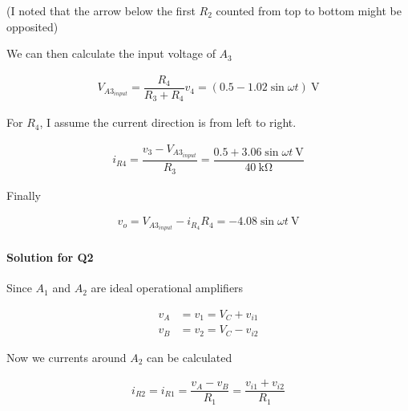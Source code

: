 \documentclass{article}
\begin{document}
(I noted that the arrow below the first $R_2$ counted from top to bottom might be opposited)

We can then calculate the input voltage of $A_3$

\begin{equation*}
  \begin{aligned}
    V_{A3_{input}} = \dfrac{R_4}{R_3 + R_4} v_4  = \left( 0.5 - 1.02 \sin \omega t \right) \  \mathrm{V}
  \end{aligned}
\end{equation*}

For $R_4$, I assume the current direction is from left to right.

\begin{equation*}
  \begin{aligned}
    i_{R4} = \dfrac{v_3 - V_{A3_{input}}}{R_3} = \dfrac{0.5 + 3.06 \sin \omega t \  \mathrm{V}}{40 \  \mathrm{k\Omega}} 
  \end{aligned}
\end{equation*}

Finally

\begin{equation*}
  \begin{aligned}
    v_o = V_{A3_{input}} - i_{R_4} R_4 = - 4.08 \sin \omega t \  \mathrm{V}
  \end{aligned}
\end{equation*}

\paragraph{Solution for Q2}

Since $A_1$ and $A_2$ are ideal operational amplifiers

\begin{equation*}
  \begin{aligned}
    v_A &= v_1 = V_C + v_{i1} \\
    v_B &= v_2 = V_C - v_{i2}
  \end{aligned}
\end{equation*}

Now we currents around $A_2$ can be calculated

\begin{equation*}
  \begin{aligned}
    i_{R2} = i_{R1} = \dfrac{v_A - v_B}{R_1} = \dfrac{v_{i1} + v_{i2}}{R_1}
  \end{aligned}
\end{equation*}
\end{document}
